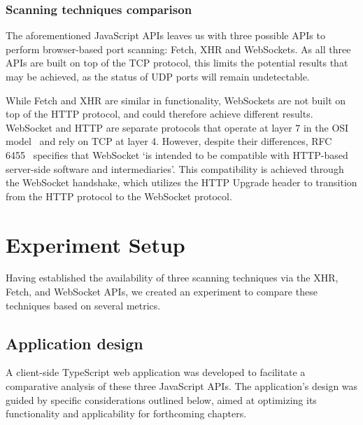 \subsubsection{Scanning techniques comparison}

The aforementioned JavaScript APIs leaves us with three possible APIs to perform browser-based port scanning: Fetch, XHR and WebSockets. As all three APIs are built on top of the TCP protocol, this limits the potential results that may be achieved, as the status of UDP ports will remain undetectable. 

While Fetch and XHR are similar in functionality, WebSockets are not built on top of the HTTP protocol, and could therefore achieve different results. WebSocket and HTTP are separate protocols that operate at layer 7 in the OSI model~ and rely on TCP at layer 4. However, despite their differences, RFC 6455~ specifies that WebSocket `is intended to be compatible with HTTP-based server-side software and intermediaries'. This compatibility is achieved through the WebSocket handshake, which utilizes the HTTP Upgrade header to transition from the HTTP protocol to the WebSocket protocol.

\section{Experiment Setup}

Having established the availability of three scanning techniques via the XHR, Fetch, and WebSocket APIs, we created an experiment to compare these techniques based on several metrics.

\subsection{Application design}
\label{section:port-scanner-application}

A client-side TypeScript web application was developed to facilitate a comparative analysis of these three JavaScript APIs. The application's design was guided by specific considerations outlined below, aimed at optimizing its functionality and applicability for forthcoming chapters.

